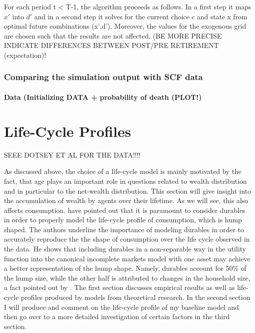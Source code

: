 \documentclass[a4paper,12pt,legno]{article}
\begin{document}
For each period t < T-1, the algorithm proceeds as follows. In a first step it maps $x'$ into $d'$ and in a second step it solves for the current choice c and state x from optimal future combinations (x',d'). Moreover, the values for the exogenous grid are chosen such that the results are not affected. (BE MORE PRECISE
INDICATE DIFFERENCES BETWEEN POST/PRE RETIREMENT (expectation)!

\subsubsection{Comparing the simulation output with SCF data}

\paragraph{Data (Initializing DATA + probability of death (PLOT!)}



\section{Life-Cycle Profiles}
\label{life_cycle_profiles}


SEEE DOTSEY ET AL FOR THE DATA!!!! 

As discussed above, the choice of a life-cycle model is mainly motivated by the fact, that age plays an important role in questions related to wealth distribution and in particular to the net-wealth distribution. This section will give insight into the accumulation of wealth by agents over their lifetime. As we will see, this also affects consumption. \cite{FV&K2011} have pointed out that it is paramount to consider durables in order to properly model the life-cycle profile of consumption, which is hump shaped. The authors underline the importance of modeling durables in order to accurately reproduce the the shape of consumption over the life cycle observed in the data. He shows that including durables in a non-separable way in the utility function into the canonical incomplete markets model with one asset may achieve a better representation of the hump shape. Namely, durables account for 50\% of the hump size, while the other half is attributed to changes in the household size, a fact pointed out by \cite{attanasio1999}. The first section discusses empirical results as well as life-cycle profiles produced by models from theoretical research. In the second section I will produce and comment on the life-cycle profile of my baseline model and then go over to a more detailed investigation of certain factors in the third section. 
\end{document}
